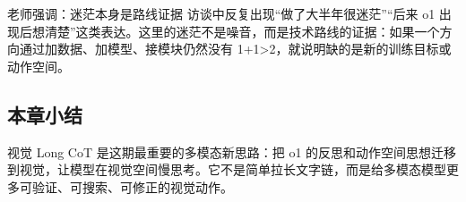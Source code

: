\begin{importantbox}{老师强调：迷茫本身是路线证据}
访谈中反复出现“做了大半年很迷茫”“后来 o1 出现后想清楚”这类表达。这里的迷茫不是噪音，而是技术路线的证据：如果一个方向通过加数据、加模型、接模块仍然没有 1+1>2，就说明缺的是新的训练目标或动作空间。
\end{importantbox}

\subsection{本章小结}

视觉 Long CoT 是这期最重要的多模态新思路：把 o1 的反思和动作空间思想迁移到视觉，让模型在视觉空间慢思考。它不是简单拉长文字链，而是给多模态模型更多可验证、可搜索、可修正的视觉动作。

